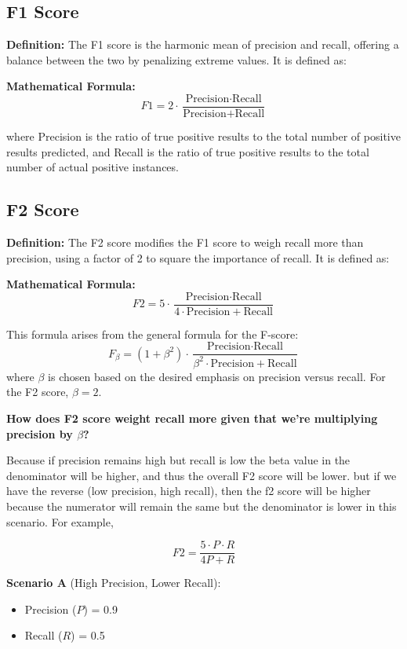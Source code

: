 \documentclass[12pt]{article}
\begin{document}
\subsection{F1 Score}

\textbf{Definition:} The F1 score is the harmonic mean of precision and recall, offering a balance between the two by penalizing extreme values. It is defined as:

\textbf{Mathematical Formula:}
\[ F1 = 2 \cdot \frac{\text{Precision} \cdot \text{Recall}}{\text{Precision} + \text{Recall}} \]

where Precision is the ratio of true positive results to the total number of positive results predicted, and Recall is the ratio of true positive results to the total number of actual positive instances.

\subsection{F2 Score}

\textbf{Definition:} The F2 score modifies the F1 score to weigh recall more than precision, using a factor of 2 to square the importance of recall. It is defined as:

\textbf{Mathematical Formula:}
\[ F2 = 5 \cdot \frac{\text{Precision} \cdot \text{Recall}}{4\cdot\text{Precision} + \text{Recall}} \]

This formula arises from the general formula for the F-score:
\[ F_\beta = (1 + \beta^2) \cdot \frac{\text{Precision} \cdot \text{Recall}}{\beta^2 \cdot \text{Precision} + \text{Recall}} \]
where \( \beta \) is chosen based on the desired emphasis on precision versus recall. For the F2 score, \( \beta = 2 \).

\textbf{How does F2 score weight recall more given that we're multiplying precision by \( \beta \)?}

Because if precision remains high but recall is low the beta value in the denominator will be higher, and thus the overall F2 score will be lower. but if we have the reverse (low precision, high recall), then the f2 score will be higher because the numerator will remain the same but the denominator is lower in this scenario. For example, 

\[ F2 = \frac{5 \cdot P \cdot R}{4P + R} \]

\textbf{Scenario A} (High Precision, Lower Recall):
\begin{itemize}
    \item Precision (\(P\)) = 0.9
    \item Recall (\(R\)) = 0.5
\end{itemize}
\end{document}
